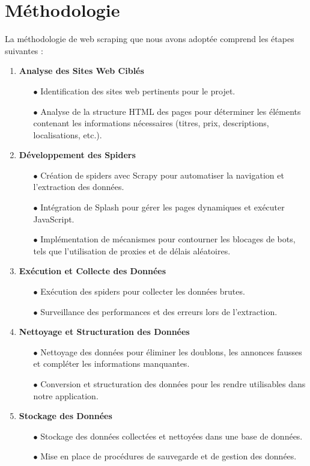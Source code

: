 \documentclass[a4paper,12pt]{report}
\numberwithin{equation}{section}
\begin{document}
\section{Méthodologie}
\large{
\par La méthodologie de web scraping que nous avons adoptée comprend les étapes suivantes :\par
}
\begin{enumerate}
    \item \textbf{Analyse des Sites Web Ciblés}
    \begin{itemize}
        \item[$\bullet$] Identification des sites web pertinents pour le projet.
        \item[$\bullet$] Analyse de la structure HTML des pages pour déterminer les éléments contenant les informations nécessaires (titres, prix, descriptions, localisations, etc.).
    \end{itemize}
    \item \textbf{Développement des Spiders}
    \begin{itemize}
        \item[$\bullet$] Création de spiders avec Scrapy pour automatiser la navigation et l'extraction des données.
        \item[$\bullet$] Intégration de Splash pour gérer les pages dynamiques et exécuter JavaScript.
        \item[$\bullet$] Implémentation de mécanismes pour contourner les blocages de bots, tels que l'utilisation de proxies et de délais aléatoires.
    \end{itemize}
    \item \textbf{Exécution et Collecte des Données}
    \begin{itemize}
        \item[$\bullet$] Exécution des spiders pour collecter les données brutes.
        \item[$\bullet$] Surveillance des performances et des erreurs lors de l'extraction.
    \end{itemize}
    \item \textbf{Nettoyage et Structuration des Données}
    \begin{itemize}
        \item[$\bullet$] Nettoyage des données pour éliminer les doublons, les annonces fausses et compléter les informations manquantes.
        \item[$\bullet$] Conversion et structuration des données pour les rendre utilisables dans notre application.
    \end{itemize}
    \item \textbf{Stockage des Données}
    \begin{itemize}
        \item[$\bullet$] Stockage des données collectées et nettoyées dans une base de données.
        \item[$\bullet$] Mise en place de procédures de sauvegarde et de gestion des données.
    \end{itemize}
\end{enumerate}
\end{document}
